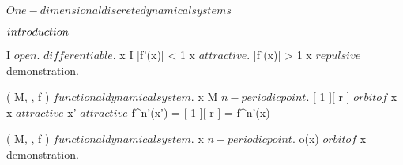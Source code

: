 \documentclass[../Main/main]{subfiles}
\begin{document}
\unit{ $ One-dimensional discrete dynamical systems $ }
{
	\introduction
	{ 
		$introduction\\$ 
	}

	{
		{
			I \subset \R $ open $.
			 $ differentiable $.
			x \in I
		}
		\holds
		{
			|f'(x)| < 1 \imp x $ attractive $.
			|f'(x)| > 1 \imp x $ repulsive $
		}
		\demonstration
		{
			demonstration.
		}
	}
	
	
	{
		{
			( M, \N, f ) $ functional dynamical system $.
			x \in M $ n-periodic point $.
			[ 1 ][ r ] $ orbit of $ x
		}
		\holds
		{
			x $ attractive $ \ifandonlyif {}
			{
				x' $ attractive $
			}
		}
		\demonstration
		{
			{
				f^{n'}(x') = [ 1 ][ r ] = f^{n'}(x)
			}
		}
	}


	{
		{
			( M, \N, f ) $ functional dynamical system $.
			x $ n-periodic point $.
			o(x) $ orbit of $ x
		}
		\holds
		{
			{
			}
		}
		\demonstration
		{
			demonstration.
		}
	}
	
	
	
	
	
	

}
\end{document}
